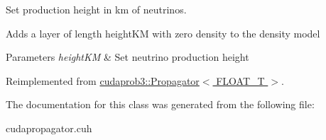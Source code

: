 Set production height in km of neutrinos. 

Adds a layer of length height\+KM with zero density to the density model 
\begin{DoxyParams}{Parameters}
{\em height\+KM} & Set neutrino production height \\
\hline
\end{DoxyParams}


Reimplemented from \hyperlink{classcudaprob3_1_1Propagator_a5db866f0c9852d65cc2b1e43bbc3bef5}{cudaprob3\+::\+Propagator$<$ F\+L\+O\+A\+T\+\_\+\+T $>$}.



The documentation for this class was generated from the following file\+:\begin{DoxyCompactItemize}
\item 
cudapropagator.\+cuh\end{DoxyCompactItemize}
